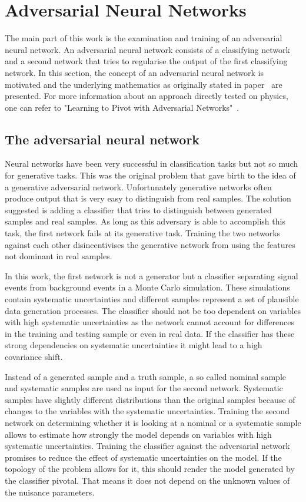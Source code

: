 \section{Adversarial Neural Networks}

The main part of this work is the examination and training of an adversarial neural network. An adversarial neural network consists of a classifying network and a second network that tries to regularise the output of the first classifying network.
%
In this section, the concept of an adversarial neural network is motivated and the underlying mathematics as originally stated in paper~\cite{2014arXiv1406.2661G} are presented.
For more information about an approach directly tested on physics, one can refer to "Learning to Pivot with Adversarial Networks"~\cite{Louppe:2016ylz}.

\subsection{The adversarial neural network}

Neural networks have been very successful in classification tasks but not so much for generative tasks. This was the original problem that gave birth to the idea of a generative adversarial network. Unfortunately generative networks often produce output that is very easy to distinguish from real samples. The solution suggested is adding a classifier that tries to distinguish between generated samples and real samples. As long as this adversary is able to accomplish this task, the first network fails at its generative task. Training the two networks against each other disincentivises the generative network from using the features not dominant in real samples.

In this work, the first network is not a generator but a classifier separating signal events from background events in a Monte Carlo simulation. These simulations contain systematic uncertainties and different samples represent a set of plausible data generation processes. The classifier should not be too dependent on variables with high systematic uncertainties as the network cannot account for differences in the training and testing sample or even in real data. If the classifier has these strong dependencies on systematic uncertainties it might lead to a high covariance shift.

Instead of a generated sample and a truth sample, a so called nominal sample and systematic samples are used as input for the second network. Systematic samples have slightly different distributions than the original samples because of changes to the variables with the systematic uncertainties. Training the second network on determining whether it is looking at a nominal or a systematic sample allows to estimate how strongly the model depends on variables with high systematic uncertainties. Training the classifier against the adversarial network promises to reduce the effect of systematic uncertainties on the model. If the topology of the problem allows for it, this should render the model generated by the classifier pivotal. That means it does not depend on the unknown values of the nuisance parameters.

